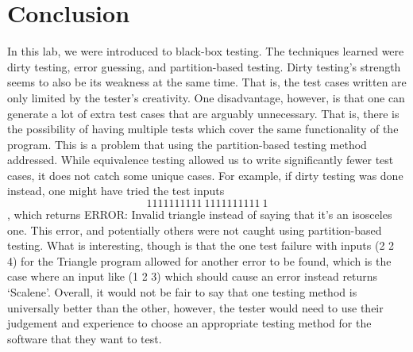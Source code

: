 \documentclass[letterpaper]{article}
\begin{document}
\section*{Conclusion}
In this lab, we were introduced to black-box testing. The techniques
learned were dirty testing, error guessing, and partition-based testing.
Dirty testing's strength seems to also be its weakness at the same time. That is,
the test cases written are only limited by the tester's creativity.
One disadvantage, however, is that one can generate a lot of extra test cases
that are arguably unnecessary. That is, there is the possibility of having multiple
tests which cover the same functionality of the program. This is a problem that
using the partition-based testing method addressed. While equivalence testing allowed us 
to write significantly fewer test cases,
it does not catch some unique cases. For example, if dirty testing was done instead,
one might have tried the test inputs $$1111111111\ 1111111111\ 1$$, which returns ERROR: Invalid triangle
instead of saying that it's an isosceles one. This error, and potentially others were not
caught using partition-based testing. What is interesting, though is that the one
test failure with inputs (2 2 4) for the Triangle program allowed for another error to be found, which is
the case where an input like (1 2 3) which should cause an error instead returns `Scalene'.
Overall, it would not be fair to say that
one testing method is universally better than the other, however, the tester would
need to use their judgement and experience to choose an appropriate testing method
for the software that they want to test.

\vfill
\appendix






\end{document}
